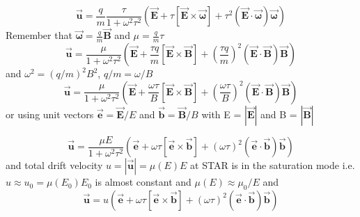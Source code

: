 \documentclass[12pt]{article} %
\begin{document}
\begin{equation*} 
 \overrightarrow{\mathbf{u}}=
\frac{q}{m}  \frac{\tau}{1 + \omega^2\tau^2} 
\left(
\overrightarrow{\mathbf{E}} + 
\tau [\overrightarrow{\mathbf{E}} \times \overrightarrow{\mathbf{\omega}}] + 
\tau^2 (\overrightarrow{\mathbf{E}} \cdot \overrightarrow{\mathbf{\omega}}) \overrightarrow{\mathbf{\omega}} 
\right)
\end{equation*}
Remember that $\overrightarrow{\mathbf{\omega}} = \frac{q}{m} \overrightarrow{\mathbf{B}}$ 
and $\mu = \frac{q}{m} \tau$
\begin{equation*} 
 \overrightarrow{\mathbf{u}}=
\frac{\mu}{1 + \omega^2\tau^2} 
\left(
\overrightarrow{\mathbf{E}} + 
 \frac{\tau q}{m}    [\overrightarrow{\mathbf{E}} \times \overrightarrow{\mathbf{B}}] + 
(\frac{\tau q}{m})^2 (\overrightarrow{\mathbf{E}} \cdot  \overrightarrow{\mathbf{B}}) \overrightarrow{\mathbf{B}} 
\right)
\end{equation*}
and $\omega^2 = (q/m)^2 B^2$, $q/m = \omega/B$
\begin{equation*} 
 \overrightarrow{\mathbf{u}}=
\frac{\mu}{1 + \omega^2\tau^2} 
\left(
\overrightarrow{\mathbf{E}} + 
\frac{\omega \tau}{B}     [\overrightarrow{\mathbf{E}} \times \overrightarrow{\mathbf{B}}] + 
(\frac{\omega \tau}{B})^2 (\overrightarrow{\mathbf{E}} \cdot  \overrightarrow{\mathbf{B}}) \overrightarrow{\mathbf{B}} 
\right)
\end{equation*}
or using unit vectors $\overrightarrow{\mathbf{e}} = \overrightarrow{\mathbf{E}}/E$ and $\overrightarrow{\mathbf{b}} = \overrightarrow{\mathbf{B}}/B$
with E = 
$\left| \overrightarrow{\mathbf{E}} \right|$ and  
B = $\left|\overrightarrow{\mathbf{B}} \right|$ 

\begin{equation} \label{ueq}
 \overrightarrow{\mathbf{u}}=
\frac{\mu E}{1 + \omega^2\tau^2} 
\left(
 \overrightarrow{\mathbf{e}} + 
 \omega \tau    [ \overrightarrow{\mathbf{e}} \times \overrightarrow{\mathbf{b}}] + 
(\omega \tau)^2 ( \overrightarrow{\mathbf{e}} \cdot  \overrightarrow{\mathbf{b}}) \overrightarrow{\mathbf{b}} 
\right)
\end{equation}
and total drift velocity 
$u = \left| \overrightarrow{\mathbf{u}} \right| = \mu ( E ) E$
at STAR is in the saturation mode i.e. $ u \approx u_{0} = \mu ( E_{0} ) E_{0}$ is almost constant and $\mu (E) \approx \mu_{0} / E $
and
\begin{equation} \label{ueq}
 \overrightarrow{\mathbf{u}}= u
\left(
 \overrightarrow{\mathbf{e}} + 
 \omega \tau    [ \overrightarrow{\mathbf{e}} \times \overrightarrow{\mathbf{b}}] + 
(\omega \tau)^2 ( \overrightarrow{\mathbf{e}} \cdot  \overrightarrow{\mathbf{b}}) \overrightarrow{\mathbf{b}} 
\right)
\end{equation}
\end{document}
